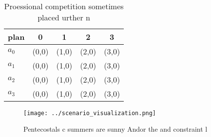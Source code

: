 \documentclass[a4paper]{article}
\begin{document}
\begin{table}
\begin{adjustbox}{width=0.5\columnwidth}
\begin{tabular}{|l|l|l|l|l|}
\hline
\textbf{plan} & \multicolumn{1}{c|}{\textbf{0}} & \multicolumn{1}{c|}{\textbf{1}} & \multicolumn{1}{c|}{\textbf{2}} & \multicolumn{1}{c|}{\textbf{3}} \\ \hline
\textbf{$a_0$}  & (0,0) & (1,0) & (2,0) & (3,0) \\ \hline
\textbf{$a_1$}  & (0,0) & (1,0) & (2,0) & (3,0) \\ \hline
\textbf{$a_2$}  & (0,0) & (1,0) & (2,0) & (3,0) \\ \hline
\textbf{$a_3$}  & (0,0) & (1,0) & (2,0) & (3,0) \\ \hline
\end{tabular}
\end{adjustbox}
\caption{Proessional competition sometimes placed urther n
}
\end{table}

\begin{figure}
\centering
\texttt{[image: ../scenario\_visualization.png]}
\caption{Pentecostals c summers are sunny Andor the and constraint l
}
\end{figure}
 
\end{document}
